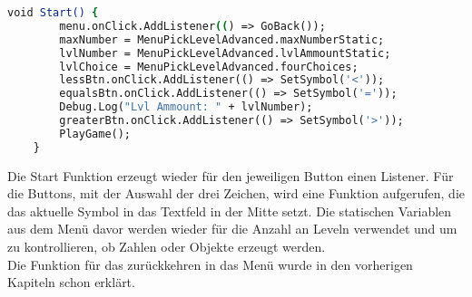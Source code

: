 \begin{lstlisting}[language=csh, caption={GameQuantities.cs Start-Funktion}]
	void Start() {
		menu.onClick.AddListener(() => GoBack());
		maxNumber = MenuPickLevelAdvanced.maxNumberStatic;
		lvlNumber = MenuPickLevelAdvanced.lvlAmmountStatic;
		lvlChoice = MenuPickLevelAdvanced.fourChoices;
		lessBtn.onClick.AddListener(() => SetSymbol('<'));
		equalsBtn.onClick.AddListener(() => SetSymbol('='));
		Debug.Log("Lvl Ammount: " + lvlNumber);
		greaterBtn.onClick.AddListener(() => SetSymbol('>'));
		PlayGame();
	}
\end{lstlisting}
Die Start Funktion erzeugt wieder für den jeweiligen Button einen Listener. Für die Buttons, mit der Auswahl der drei Zeichen, wird eine Funktion aufgerufen, die das aktuelle Symbol in das Textfeld in der Mitte setzt. Die statischen Variablen aus dem Menü davor werden wieder für die Anzahl an Leveln verwendet und um zu kontrollieren, ob Zahlen oder Objekte erzeugt werden.\\

Die Funktion für das zurückkehren in das Menü wurde in den vorherigen Kapiteln schon erklärt.\\

